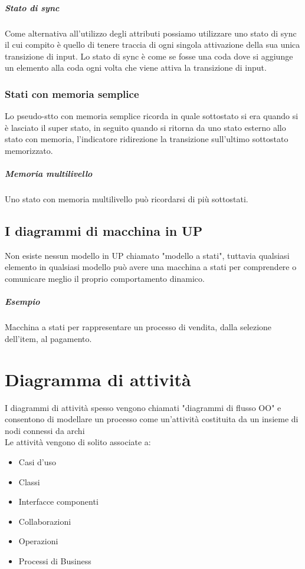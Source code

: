 \paragraph*{Stato di sync} Come alternativa all'utilizzo degli attributi possiamo utilizzare uno stato di sync
il cui compito è quello di tenere traccia di ogni singola attivazione della sua unica transizione di
input. Lo stato di sync è come se fosse una coda dove si aggiunge un elemento alla coda ogni volta
che viene attiva la transizione di input.
\subsection*{Stati con memoria semplice} 
Lo pseudo-stto con memoria semplice ricorda in quale sottostato si era quando si è lasciato il super stato,
in seguito quando si ritorna da uno stato esterno allo stato con memoria, l'indicatore ridirezione la 
transizione sull'ultimo sottostato memorizzato.
\paragraph*{Memoria multilivello} Uno stato con memoria multilivello può ricordarsi di più sottostati.
\section{I diagrammi di macchina in UP}
Non esiste nessun modello in UP chiamato "modello a stati", tuttavia qualsiasi elemento in qualsiasi modello
può avere una macchina a stati per comprendere o comunicare meglio il proprio comportamento dinamico.
\paragraph*{Esempio} Macchina a stati per rappresentare un processo di vendita, dalla selezione dell'item,
al pagamento.

\chapter{Diagramma di attività}
I diagrammi di attività spesso vengono chiamati "diagrammi di flusso OO" e consentono
di modellare un processo come un'attività costituita da un insieme di nodi connessi da archi
\\ Le attività vengono di solito associate a:
\begin{itemize}
    \item Casi d'uso
    \item Classi
    \item Interfacce componenti
    \item Collaborazioni
    \item Operazioni
    \item Processi di Business
\end{itemize}
